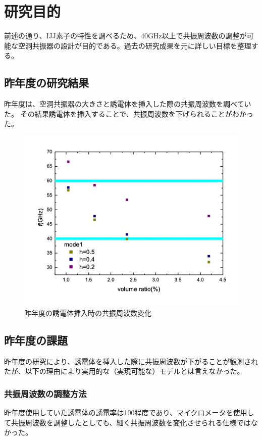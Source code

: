 \chapter{研究目的}
前述の通り、IJJ素子の特性を調べるため、40GHz以上で共振周波数の調整が可能な空洞共振器の設計が目的である。過去の研究成果を元に詳しい目標を整理する。

\section{昨年度の研究結果}
昨年度は、空洞共振器の大きさと誘電体を挿入した際の共振周波数を調べていた。\cite{わたなべ}
その結果誘電体を挿入することで、共振周波数を下げられることがわかった。

\vspace{10 mm}

\begin{figure}[h]
  \begin{center}
    \includegraphics[width=12cm]{./image/watanabe.png}
    \caption{昨年度の誘電体挿入時の共振周波数変化}
    \label{fig:Watanabe}
  \end{center}
\end{figure}

\section{昨年度の課題}
昨年度の研究により、誘電体を挿入した際に共振周波数が下がることが観測されたが、以下の理由により実用的な（実現可能な）モデルとは言えなかった。


\subsection{共振周波数の調整方法}
昨年度使用していた誘電体の誘電率は100程度であり、マイクロメータを使用して共振周波数を調整したとしても、細く共振周波数を変化させられる仕様ではなかった。



